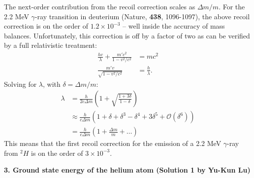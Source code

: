 \documentclass{article}
\theoremstyle{definition}
\newcommand{\lp}{\left(}
\newcommand{\rp}{\right)}
\begin{document}
\begin{enumerate}[label=\alph*)]
The next-order contribution from the recoil correction scales as $\Delta m/m$. For the 2.2 MeV
$\gamma$-ray transition in deuterium (Nature, \textbf{438}, 1096-1097), the above recoil correction is on the order of $1.2\times 10^{-3}$ -- well inside the accuracy of mass balances. Unfortunately, this correction is off by a factor of two as can be verified by a full relativistic treatment:
\begin{align*}
\frac{hc}{\lambda} + \frac{m'c^2}{1 -  v^2/c^2} &= mc^2 \\
\frac{m'v}{\sqrt{1 - v^2/c^2}} &= \frac{h}{\lambda}.
\end{align*}
Solving for $\lambda$, with $\delta = \Delta m/m$:
\begin{align*}
\lambda &= \frac{h}{2c\Delta m}  \lp 1 + \sqrt{\frac{1 + 3\delta}{1 - \delta}}\rp \\
&\approx \frac{h}{c\Delta m} (1 + \delta + \delta^3  - \delta^4 + 3\delta^5 + \mathcal{O}(\delta^6)  ) \\
&= \frac{h}{c\Delta m} \lp 1 + \frac{\Delta m}{m} + \dots \rp
\end{align*}
This means that the first recoil correction for the emission of a 2.2 MeV $\gamma$-ray from $^2 H$ is on the order of $3 \times 10^{-3}$.

\end{enumerate}

\noindent \textbf{3. Ground state energy of the helium atom (Solution 1 by Yu-Kun Lu)}\\
\end{document}
